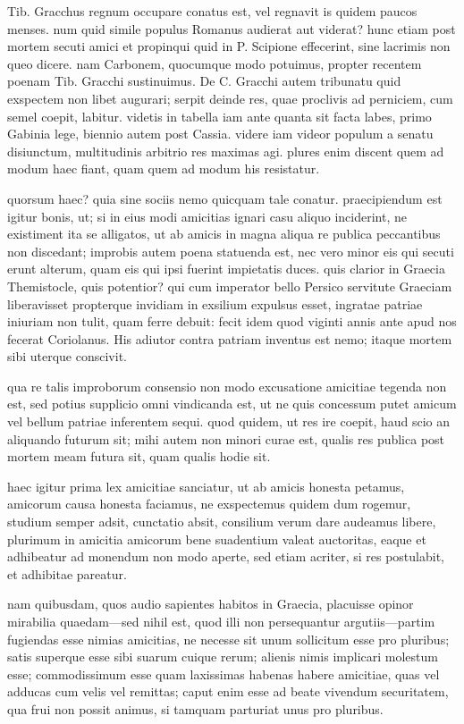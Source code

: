  Tib. Gracchus regnum occupare conatus est, vel regnavit is quidem paucos menses. num quid simile populus Romanus audierat aut viderat? hunc etiam post mortem secuti amici et propinqui quid in P. Scipione effecerint, sine lacrimis non queo dicere. nam Carbonem, quocumque modo potuimus, propter recentem poenam Tib. Gracchi sustinuimus. De C. Gracchi autem tribunatu quid exspectem non libet augurari; serpit deinde res, quae proclivis ad perniciem, cum semel coepit, labitur. videtis in tabella iam ante quanta sit facta labes, primo Gabinia lege, biennio autem post Cassia. videre iam videor populum a senatu disiunctum, multitudinis arbitrio res maximas agi. plures enim discent quem ad modum haec fiant, quam quem ad modum his resistatur.

 quorsum haec? quia sine sociis nemo quicquam tale conatur. praecipiendum est igitur bonis, ut; si in eius modi amicitias ignari casu aliquo inciderint, ne existiment ita se alligatos, ut ab amicis in magna aliqua re publica peccantibus non discedant; improbis autem poena statuenda est, nec vero minor eis qui secuti erunt alterum, quam eis qui ipsi fuerint impietatis duces. quis clarior in Graecia Themistocle, quis potentior? qui cum imperator bello Persico servitute Graeciam liberavisset propterque invidiam in exsilium expulsus esset, ingratae patriae iniuriam non tulit, quam ferre debuit: fecit idem quod viginti annis ante apud nos fecerat Coriolanus. His adiutor contra patriam inventus est nemo; itaque mortem sibi uterque conscivit.

 qua re talis improborum consensio non modo excusatione amicitiae tegenda non est, sed potius supplicio omni vindicanda est, ut ne quis concessum putet amicum vel bellum patriae inferentem sequi. quod quidem, ut res ire coepit, haud scio an aliquando futurum sit; mihi autem non minori curae est, qualis res publica post mortem meam futura sit, quam qualis hodie sit.

 haec igitur prima lex amicitiae sanciatur, ut ab amicis honesta petamus, amicorum causa honesta faciamus, ne exspectemus quidem dum rogemur, studium semper adsit, cunctatio absit, consilium verum dare audeamus libere, plurimum in amicitia amicorum bene suadentium valeat auctoritas, eaque et adhibeatur ad monendum non modo aperte, sed etiam acriter, si res postulabit, et adhibitae pareatur.

 nam quibusdam, quos audio sapientes habitos in Graecia, placuisse opinor mirabilia quaedam—sed nihil est, quod illi non persequantur argutiis—partim fugiendas esse nimias amicitias, ne necesse sit unum sollicitum esse pro pluribus; satis superque esse sibi suarum cuique rerum; alienis nimis implicari molestum esse; commodissimum esse quam laxissimas habenas habere amicitiae, quas vel adducas cum velis vel remittas; caput enim esse ad beate vivendum securitatem, qua frui non possit animus, si tamquam parturiat unus pro pluribus.


